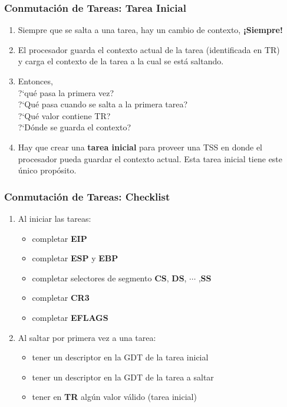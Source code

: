 \documentclass[aspectratio=169]{beamer}
\begin{document}
\begin{frame}
\frametitle{Conmutaci\'on de Tareas: Tarea Inicial}
\begin{enumerate}
	\item<2-> Siempre que se salta a una tarea, hay un cambio de contexto, \textbf{¡Siempre!}
	\vspace{0.4cm}
	\item<3-> El procesador guarda el contexto actual de la tarea (identificada en TR)\\ y carga el contexto de la tarea a la cual se est\'a saltando.
	\vspace{0.4cm}
	\item<4-> Entonces,\\ ?`qu\'e pasa la primera vez?\\ ?`Qu\'e pasa cuando se salta a la primera tarea?\\ ?`Qu\'e valor contiene TR?\\ ?`D\'onde se guarda el contexto?
	\vspace{0.4cm}
	\item<5-> Hay que crear una \textbf{tarea inicial} para proveer una TSS en donde el procesador pueda guardar el contexto actual. \textcolor{verdeuca}{Esta tarea inicial tiene este \'unico prop\'osito.}
	\vspace{0.4cm}
\end{enumerate}
\end{frame}

\begin{frame}
\frametitle{Conmutaci\'on de Tareas: Checklist}
\begin{enumerate}
	\item Al iniciar las tareas:
		\begin{itemize}
		\item<1-> completar \textbf{EIP}
		\item<2-> completar \textbf{ESP} y  \textbf{EBP}
		\item<3-> completar selectores de segmento \textbf{CS}, \textbf{DS}, $\cdots$ ,\textbf{SS} \only<9->{{\scriptsize \textcolor{verdeuca}{(recordar RPL)}}}
		\item<4-> completar \textbf{CR3}
		\item<5-> completar \textbf{EFLAGS} \only<9->{\textcolor{verdeuca}{(*)}}
		\end{itemize}
	\vspace{0.4cm}
	\item<6-> Al saltar por primera vez a una tarea:
		\begin{itemize}
		\item<6-> tener un descriptor en la GDT de la tarea inicial
		\item<7-> tener un descriptor en la GDT de la tarea a saltar
		\item<8-> tener en \textbf{TR} alg\'un valor v\'alido (tarea inicial)
		\end{itemize}
\end{enumerate}
\end{frame}
\end{document}
